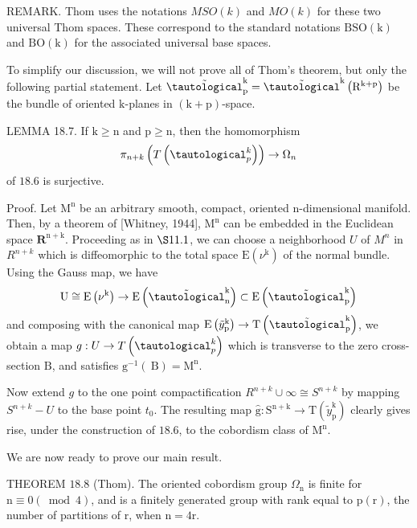 \documentclass[10pt]{article}
\begin{document}
REMARK. Thom uses the notations $M S O(k)$ and $M O(k)$ for these two universal Thom spaces. These correspond to the standard notations $\mathrm{BSO}(\mathrm{k})$ and $\mathrm{BO}(\mathrm{k})$ for the associated universal base spaces.

To simplify our discussion, we will not prove all of Thom's theorem, but only the following partial statement. Let $\tilde{\tautological}_{\mathrm{p}}^{\mathrm{k}}=\tilde{\tautological}^{\mathrm{k}}\left(\mathrm{R}^{\mathrm{k}+\mathrm{p}}\right)$ be the bundle of oriented $\mathrm{k}$-planes in $(\mathrm{k}+\mathrm{p})$-space.

LEMMA 18.7. If $\mathrm{k} \geq \mathrm{n}$ and $\mathrm{p} \geq \mathrm{n}$, then the homomorphism
$$
\pi_{n+k}\left(T\left(\tautological_{p}^{k}\right)\right) \rightarrow \Omega_{n}
$$
of $18.6$ is surjective.

Proof. Let $\mathrm{M}^{\mathrm{n}}$ be an arbitrary smooth, compact, oriented n-dimensional manifold. Then, by a theorem of [Whitney, 1944], $\mathrm{M}^{\mathrm{n}}$ can be embedded in the Euclidean space $\mathbf{R}^{\mathrm{n}+\mathrm{k}}$. Proceeding as in $\S 11.1$, we can choose a neighborhood $U$ of $M^{n}$ in $R^{n+k}$ which is diffeomorphic to the total space $\mathrm{E}\left(\nu^{\mathrm{k}}\right)$ of the normal bundle. Using the Gauss map, we have
$$
\mathrm{U} \cong \mathrm{E}\left(\nu^{\mathrm{k}}\right) \rightarrow \mathrm{E}\left(\tilde{\tautological}_{\mathrm{n}}^{\mathrm{k}}\right) \subset \mathrm{E}\left(\tilde{\tautological}_{\mathrm{p}}^{\mathrm{k}}\right)
$$
and composing with the canonical map $\mathrm{E}\left(\tilde{y}_{\mathrm{p}}^{\mathrm{k}}\right) \rightarrow \mathrm{T}\left(\tilde{\tautological}_{\mathrm{p}}^{\mathrm{k}}\right)$, we obtain a map $g: U \rightarrow T\left(\tautological_{p}^{k}\right)$ which is transverse to the zero cross-section $\mathrm{B}$, and satisfies $\mathrm{g}^{-1}(\mathrm{~B})=\mathrm{M}^{\mathrm{n}}$.

Now extend $g$ to the one point compactification $R^{n+k} \cup \infty \cong S^{n+k}$ by mapping $S^{n+k}-U$ to the base point $t_{0}$. The resulting map $\hat{\mathrm{g}}: \mathrm{S}^{\mathrm{n}+\mathrm{k}} \rightarrow \mathrm{T}\left(\tilde{y}_{\mathrm{p}}^{\mathrm{k}}\right)$ clearly gives rise, under the construction of $18.6$, to the cobordism class of $\mathrm{M}^{\mathrm{n}}$.

We are now ready to prove our main result.

THEOREM $18.8$ (Thom). The oriented cobordism group $\Omega_{\mathrm{n}}$ is finite for $\mathrm{n} \equiv 0(\bmod 4)$, and is a finitely generated group with rank equal to $\mathrm{p}(\mathrm{r})$, the number of partitions of $\mathrm{r}$, when $\mathrm{n}=4 \mathrm{r}$.
\end{document}
